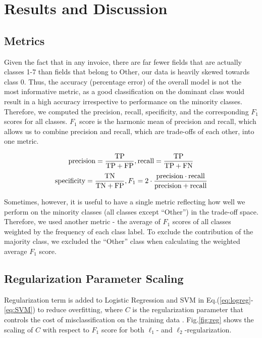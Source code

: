 \section{Results and Discussion}

\subsection{Metrics}
Given the fact that in any invoice, there are far fewer fields that are actually classes 1-7 than fields that belong to Other, our data is heavily skewed towards class 0. Thus, the accuracy (percentage error) of the overall model 
is not the most
informative metric, as a good classification on the dominant class would result in a high accuracy
irrespective to performance on the minority classes. Therefore, we computed the precision,
recall, specificity, and the corresponding $F_1$ scores for all classes. 
$F_1$ score is the harmonic mean of precision and recall\cite{powers2011evaluation}, which allows us
to combine precision and recall, which are trade-offs of each other, into one metric. 

\[ \textup{precision} = \frac{\textup{TP}}{\textup{TP}+\textup{FP}} , 
 \textup{recall} = \frac{\textup{TP}}{\textup{TP}+\textup{FN}}\]
\[\textup{specificity} = \frac{\textup{TN}}{\textup{TN}+\textup{FP}},  
 F_1 = 2\cdot \frac{\textup{precision} \cdot \textup{recall}}{\textup{precision} + \textup{recall}} \]

Sometimes, however, it is useful to have a single metric reflecting how well we perform on the minority classes (all classes except ``Other'') in the trade-off space. Therefore, we used another metric -  
the average of $F_1$ scores of all classes 
weighted by the frequency of each class label. To exclude the contribution of the majority class, we excluded the ``Other'' class when calculating the weighted average $F_1$ score. 

\subsection{Regularization Parameter Scaling}
Regularization term is added to Logistic Regression and SVM in Eq.(\ref{eq:logreg}-\ref{eq:SVM}) to reduce overfitting, where $C$ is the regularization parameter that controls the cost of misclassification on the training data \cite{chen2004support}. Fig.\ref{fig:reg} shows the scaling of $C$ with respect to $F_1$ score for both $\ell_1$- and $\ell_2$-regularization.

